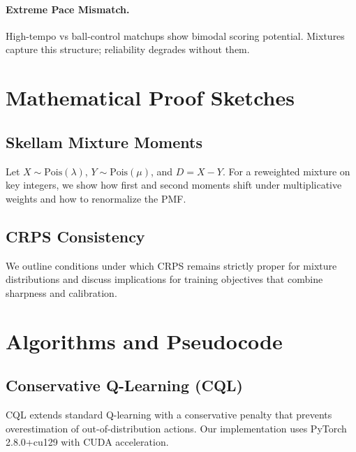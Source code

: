 \paragraph{Extreme Pace Mismatch.}
High-tempo vs ball-control matchups show bimodal scoring potential. Mixtures capture this structure; reliability degrades without them.

\section{Mathematical Proof Sketches}\label{app:proofs}

\subsection{Skellam Mixture Moments}
Let $X\sim\text{Pois}(\lambda)$, $Y\sim\text{Pois}(\mu)$, and $D=X-Y$. For a reweighted mixture on key integers, we show how first and second moments shift under multiplicative weights and how to renormalize the PMF.

\subsection{CRPS Consistency}
We outline conditions under which CRPS remains strictly proper for mixture distributions and discuss implications for training objectives that combine sharpness and calibration.

\section{Algorithms and Pseudocode}\label{app:algorithms}

\subsection{Conservative Q-Learning (CQL)}
CQL extends standard Q-learning with a conservative penalty that prevents overestimation of out-of-distribution actions. Our implementation uses PyTorch 2.8.0+cu129 with CUDA acceleration.

